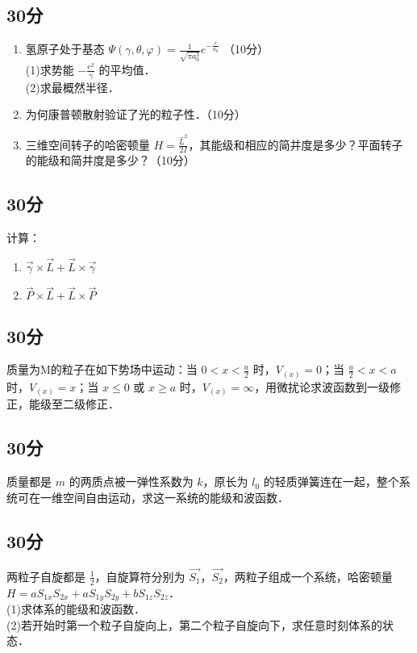 
\subsection{30分}
\begin{enumerate}
\item 氢原子处于基态 $\varPsi(\gamma,\theta,\varphi)=\frac{1}{\sqrt{\pi a^{3}_{0}}}e^{-\frac{r}{a_0}}$ （10分）\\
(1)求势能 $-\frac{e^2}{\gamma}$ 的平均值．\\
(2)求最概然半径．\\
\item 为何康普顿散射验证了光的粒子性．（10分）\\
\item 三维空间转子的哈密顿量 $H=\frac{\hat{L}^2}{2I}$，其能级和相应的简并度是多少？平面转子的能级和简并度是多少？（10分）\\
\end{enumerate}
\subsection{30分}
计算：\\
\begin{enumerate}
\item $\vec{\gamma}\times \vec{L}+ \vec{L}\times \vec{\gamma}$
\item $\vec{P}\times\vec{L}+\vec{L}\times\vec{P}$
\end{enumerate}
\subsection{30分}
质量为M的粒子在如下势场中运动：当 $0<x<\frac{a}{2}$ 时，$V_{(x)}=0$；当 $\frac{a}{2} <x<a$ 时，$V_{(x)}=x$；当 $x \le 0$ 或 $x \ge a$ 时，$V_{(x)}=\infty$，用微扰论求波函数到一级修正，能级至二级修正．
\subsection{30分}
质量都是 $m$ 的两质点被一弹性系数为 $k$，原长为 $l_{0}$ 的轻质弹簧连在一起，整个系统可在一维空间自由运动，求这一系统的能级和波函数．
\subsection{30分}
两粒子自旋都是 $\frac{1}{2}$，自旋算符分别为 $\vec{S_{1}}$，$\vec{S_{2}}$，两粒子组成一个系统，哈密顿量 $H=aS_{1x}S_{2x}+aS_{1y}S_{2y}+bS_{1z}S_{2z}$．\\
(1)求体系的能级和波函数．\\
(2)若开始时第一个粒子自旋向上，第二个粒子自旋向下，求任意时刻体系的状态．\\